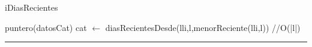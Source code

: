 \begin{algorithm}[H]
\caption{iDiasRecientes}
\begin{algorithmic}[1]
\state puntero(datosCat) cat $\gets$ diasRecientesDesde(lli,l,menorReciente(lli,l)) \hfill //O(|l|)
\EndFunction 
\end{algorithmic}
\hrule
{}
\end{algorithm}